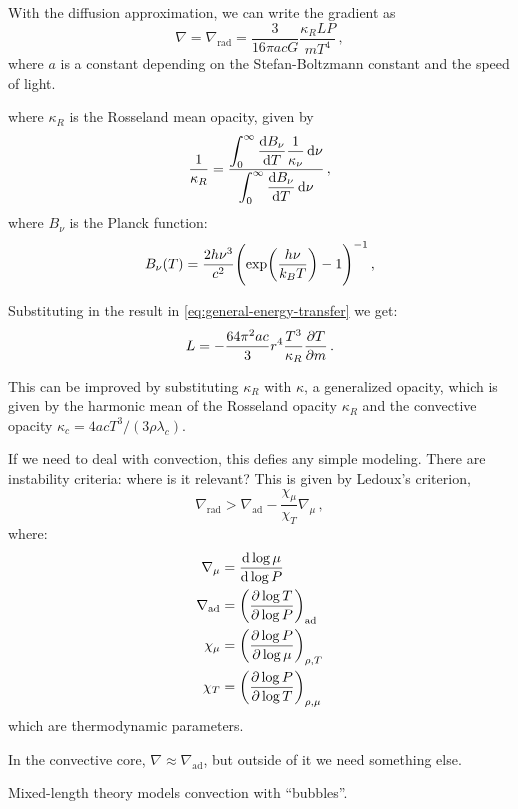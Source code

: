 \documentclass[main.tex]{subfiles}
\begin{document}
With the diffusion approximation, we can write the gradient as
%
\begin{equation} \label{eq:diffusion-approx-gradient}
    \nabla = \nabla_{\text{rad}} = \frac{3}{16 \pi a c G} \frac{\kappa_R L P}{mT^4} \,,
\end{equation}
%
where \(a\) is a constant depending on the Stefan-Boltzmann constant and the speed of light.

%
where \(\kappa_R\) is the Rosseland mean opacity, given by
%
\begin{equation}
  \frac{1}{\kappa_{R}} =
  \frac{ \displaystyle\int _{0}   ^{\infty}  \dv{B_\nu}{T} \frac{1}{\kappa_\nu} \dd{\nu}}
  {  \displaystyle \int _{0}   ^{\infty} \dv{B_\nu}{T} \dd{\nu}}\,,
\end{equation}
%
where \(B_{\nu }\) is the Planck function: 
%
\begin{align}
B_{\nu } (T) = \frac{2 h \nu^3}{ c^2} \qty(\exp(\frac{h \nu }{k_B T}) - 1)^{-1}
\,,
\end{align}
%


Substituting in the result in \eqref{eq:general-energy-transfer} we get:
%
\begin{equation}
    L = - \frac{64 \pi^2 a c }{3} r^4 \frac{T^3}{\kappa_R} \pdv{T}{m}
\,.
\end{equation}

This can be improved by substituting \(\kappa_{R}   \) with \(\kappa\), a generalized opacity, which is given by the harmonic mean of the Rosseland opacity \(\kappa _R \) and the convective opacity \(\kappa_c = 4acT^3 / (3 \rho \lambda_c )\).


If we need to deal with convection, this defies any simple modeling. There are instability criteria: where is it relevant? This is given by
Ledoux's criterion,
%
\begin{equation}
    \nabla_{\text{rad}} > \nabla_{\text{ad}} - \frac{\chi_\mu}{\chi_T} \nabla_\mu\,,
\end{equation}
%
where:
%
\begin{subequations}
\begin{align}
  \nabla_\mu  &= \dv{\log \mu }{\log P} \\
  \nabla_{\text{ad}}  &= \qty(\pdv{\log T }{\log P} )_{\text{ad}} \\
  \chi_{\mu}  &= \qty(\pdv{\log P }{\log \mu} )_{\rho, T} \\
  \chi_{T}  &= \qty(\pdv{\log P }{\log T} )_{\rho, \mu}
\end{align}
\end{subequations}
%
which are thermodynamic parameters.


In the convective core, \(\nabla \approx \nabla_{\text{ad}}\), but outside of it we need something else.

Mixed-length theory models convection with ``bubbles''.
\end{document}
